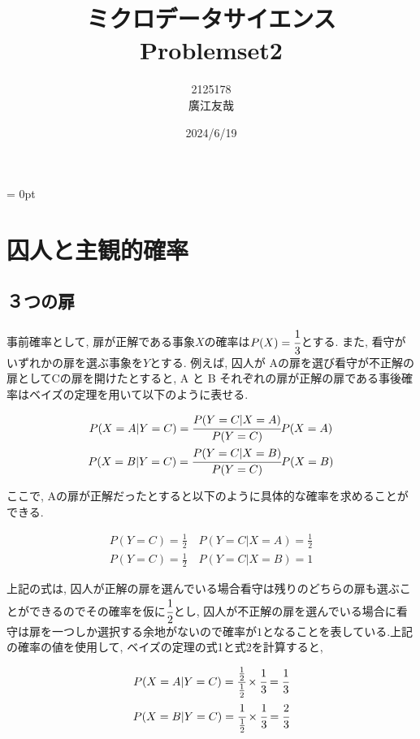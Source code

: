\documentclass{article}
\begin{document}
\parindent = 0pt

\title{ミクロデータサイエンス\\Problemset2}
\author{2125178\\廣江友哉}
\date{2024/6/19}
\maketitle


\section{囚人と主観的確率}

\subsection{３つの扉}

事前確率として, 扉が正解である事象$X$の確率は$P(X) = \cfrac{1}{3}$とする. また, 看守がいずれかの扉を選ぶ事象を$Y$とする. 例えば, 囚人が Aの扉を選び看守が不正解の扉としてCの扉を開けたとすると, A と B それぞれの扉が正解の扉である事後確率はベイズの定理を用いて以下のように表せる.

\begin{center}
	\begin{gather}
		P(X = A | Y = C) = \cfrac{P(Y = C | X = A)}{P(Y = C)} P(X = A) \\
		P(X = B | Y = C) = \cfrac{P(Y = C | X = B)}{P(Y = C)} P(X = B)
	\end{gather}
\end{center}

ここで, Aの扉が正解だったとすると以下のように具体的な確率を求めることができる.

\begin{center}
	\begin{gather}
		P(Y = C) = \frac{1}{2}\quad P(Y = C | X = A) = \frac{1}{2} \\
		P(Y = C) = \frac{1}{2}\quad P(Y = C | X = B) = 1
	\end{gather}
\end{center}

上記の式は, 囚人が正解の扉を選んでいる場合看守は残りのどちらの扉も選ぶことができるのでその確率を仮に$\cfrac{1}{2}$とし, 囚人が不正解の扉を選んでいる場合に看守は扉を一つしか選択する余地がないので確率が$1$となることを表している.上記の確率の値を使用して, ベイズの定理の式1と式2を計算すると,

\begin{center}
	\begin{gather}
		P(X = A | Y = C) = \cfrac{\frac{1}{2}}{\frac{1}{2}} \times \cfrac{1}{3} = \cfrac{1}{3} \\
		P(X = B | Y = C) = \cfrac{1}{\frac{1}{2}} \times \cfrac{1}{3} = \cfrac{2}{3}
	\end{gather}
\end{center}
\end{document}
